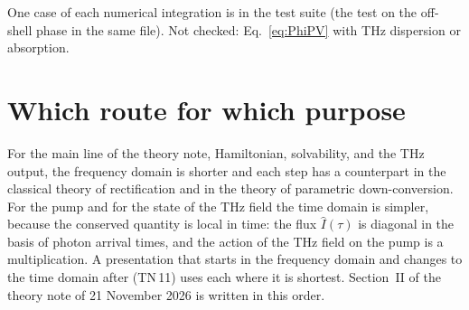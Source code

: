 \documentclass[aps,pra,onecolumn,notitlepage,11pt,amsmath,amssymb,nofootinbib]{revtex4-2}
\newcommand{\Iop}{\hat I}
\begin{document}
One case of each numerical integration is in the test suite (the test on the
off-shell phase in the same file). Not checked: Eq.~\eqref{eq:PhiPV} with THz
dispersion or absorption.

\section{Which route for which purpose}

For the main line of the theory note, Hamiltonian, solvability, and the THz
output, the frequency domain is shorter and each step has a counterpart in
the classical theory of rectification and in the theory of parametric
down-conversion. For the pump and for the state of the THz field the time
domain is simpler, because the conserved quantity is local in time: the flux
$\Iop(\tau)$ is diagonal in the basis of photon arrival times, and the action
of the THz field on the pump is a multiplication. A presentation that starts
in the frequency domain and changes to the time domain after (TN\,11) uses
each where it is shortest. Section~II of the theory note of 21 November 2026
is written in this order.
\end{document}
